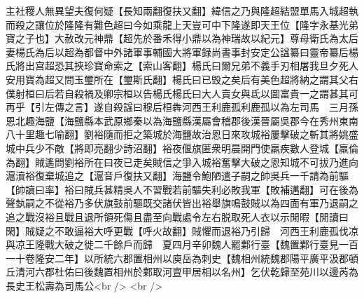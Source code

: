 主社稷人無異望夫復何疑【長知兩翻復扶又翻】緯信之乃與隆超結盟單馬入城超執而殺之讓位於隆隆有難色超曰今如乘龍上天豈可中下隆遂即天王位【隆字永基光弟寶之子也】大赦改元神鼎【超先於番禾得小鼎以為神瑞故以紀元】尊母衛氏為太后妻楊氏為后以超為都督中外諸軍事輔國大將軍録尚書事封安定公諡纂曰靈帝纂后楊氏將出宫超恐其挾珍寶命索之【索山客翻】楊氏曰爾兄弟不義手刃相屠我旦夕死人安用寶為超又問玉璽所在【璽斯氏翻】楊氏曰已毁之矣后有美色超將納之謂其父右僕射桓曰后若自殺禍及卿宗桓以告楊氏楊氏曰大人賣女與氐以圖富貴一之謂甚其可再乎【引左傳之言】遂自殺諡曰穆后桓犇河西王利鹿孤利鹿孤以為左司馬　三月孫恩北趣海鹽【海鹽縣本武原鄉秦以為海鹽縣漢屬會稽郡後漢晉屬吳郡今在秀州東南八十里趣七喻翻】劉裕隨而拒之築城於海鹽故治恩日來攻城裕屢擊破之斬其將姚盛城中兵少不敵【將即亮翻少詩沼翻】裕夜偃旗匿衆明晨開門使羸疾數人登城【羸倫為翻】賊遙問劉裕所在曰夜已走矣賊信之爭入城裕奮擊大破之恩知城不可拔乃進向滬瀆裕復棄城追之【滬音戶復扶又翻】海鹽令鮑陋遣子嗣之帥吳兵一千請為前驅【帥讀曰率】裕曰賊兵甚精吳人不習戰若前驅失利必敗我軍【敗補邁翻】可在後為聲埶嗣之不從裕乃多伏旗鼓前驅既交諸伏皆出裕舉旗鳴鼓賊以為四面有軍乃退嗣之追之戰沒裕且戰且退所領死傷且盡至向戰處令左右脱取死人衣以示閒暇【閒讀曰閑】賊疑之不敢逼裕大呼更戰【呼火故翻】賊懼而退裕乃引歸　河西王利鹿孤伐凉與凉王隆戰大破之徙二千餘戶而歸　夏四月辛卯魏人罷鄴行臺【魏置鄴行臺見一百一十卷隆安二年】以所統六郡置相州以庾岳為刺史【魏相州統魏郡陽平廣平汲郡頓丘清河六郡杜佑曰後魏置相州於鄴取河亶甲居相以名州】乞伏乾歸至苑川以邊芮為長史王松壽為司馬公<br />
<br />
